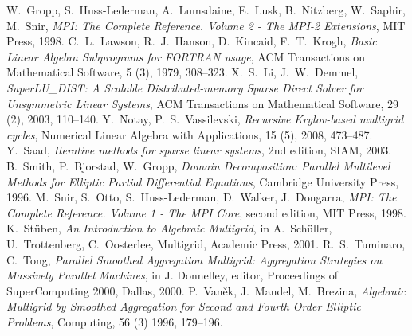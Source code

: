 \begin{thebibliography}{99}
%
W.~Gropp, S.~Huss-Lederman, A.~Lumsdaine, E.~Lusk, B.~Nitzberg, W.~Saphir, M.~Snir, 
{\em MPI: The Complete Reference. Volume 2 - The MPI-2 Extensions},
MIT Press, 1998.
%
C.~L.~Lawson, R.~J.~Hanson, D.~Kincaid, F.~T.~Krogh,
\emph{Basic Linear Algebra Subprograms for FORTRAN usage},
ACM Transactions on Mathematical Software, 5 (3), 1979, 308--323.
%
X.~S.~Li, J.~W.~Demmel,
{\em SuperLU\_DIST: A Scalable Distributed-memory
Sparse Direct Solver for Unsymmetric Linear Systems},
ACM Transactions on Mathematical Software, 29 (2), 2003, 110--140.
%
Y.~Notay, P.~S.~Vassilevski,
{\em Recursive Krylov-based multigrid cycles},
Numerical Linear Algebra with Applications, 15 (5), 2008, 473--487. 
%
Y.~Saad,
{\em Iterative methods for sparse linear systems}, 2nd edition, SIAM, 2003.
%
B.~Smith, P.~Bjorstad, W.~Gropp,
{\em Domain Decomposition: Parallel Multilevel Methods for Elliptic
Partial Differential Equations},
Cambridge University Press, 1996.
%
M.~Snir, S.~Otto, S.~Huss-Lederman, D.~Walker, J.~Dongarra,
{\em MPI: The Complete Reference. Volume 1 - The MPI Core}, second edition,
MIT Press, 1998.
%
K.~St\"{u}ben,
{\em An Introduction to Algebraic Multigrid},
in A.~Sch\"{u}ller, U.~Trottenberg, C.~Oosterlee, Multigrid,
Academic Press, 2001.
%
R.~S.~Tuminaro, C.~Tong,
{\em Parallel Smoothed Aggregation Multigrid: Aggregation Strategies on Massively Parallel Machines}, in J. Donnelley, editor, Proceedings of SuperComputing 2000, Dallas, 2000.
%
P.~Van\v{e}k, J.~Mandel, M.~Brezina,
{\em Algebraic Multigrid by Smoothed Aggregation for Second and Fourth Order Elliptic Problems},
Computing, 56 (3) 1996, 179--196.

\end{thebibliography}
